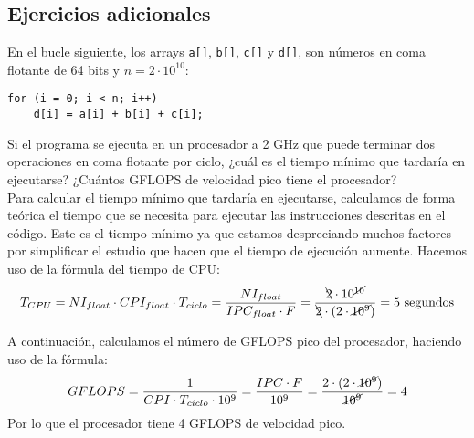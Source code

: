 \subsection{Ejercicios adicionales}
\begin{ejercicio}
    En el bucle siguiente, los arrays \verb|a[]|, \verb|b[]|, \verb|c[]| y \verb|d[]|, son números en coma flotante de 64 bits y $n = 2\cdot 10^{10}$:
    \begin{verbatim}
for (i = 0; i < n; i++)
    d[i] = a[i] + b[i] + c[i];
    \end{verbatim}

    Si el programa se ejecuta en un procesador a 2 GHz que puede terminar dos operaciones en coma flotante por ciclo, ¿cuál es el tiempo mínimo que tardaría en ejecutarse? ¿Cuántos GFLOPS de velocidad pico tiene el procesador?\\

    Para calcular el tiempo mínimo que tardaría en ejecutarse, calculamos de forma teórica el tiempo que se necesita para ejecutar las instrucciones descritas en el código. Este es el tiempo mínimo ya que estamos despreciando muchos factores por simplificar el estudio que hacen que el tiempo de ejecución aumente. Hacemos uso de la fórmula del tiempo de CPU:
    \begin{equation*}
        T_{CPU} = NI_{float} \cdot CPI_{float} \cdot T_{ciclo} = \dfrac{NI_{float}}{IPC_{float} \cdot F} = \dfrac{\bcancel{2}\cdot 10^{\cancel{10}}}{\bcancel{2} \cdot (2\cdot \cancel{10^9})} = 5 \text{\ segundos}
    \end{equation*}

    A continuación, calculamos el número de GFLOPS pico del procesador, haciendo uso de la fórmula:
    \begin{equation*}
    GFLOPS = \dfrac{1}{CPI \cdot T_{ciclo} \cdot 10^9} = \dfrac{IPC \cdot F}{10^9} = \dfrac{2 \cdot (2 \cdot \cancel{10^9})}{\cancel{10^9}} = 4
    \end{equation*}
    Por lo que el procesador tiene 4 GFLOPS de velocidad pico.
\end{ejercicio}

